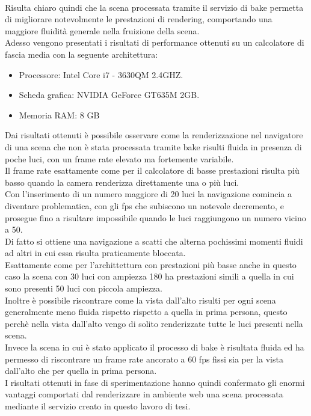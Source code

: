\\
Risulta chiaro quindi che la scena processata tramite il servizio di bake permetta di migliorare notevolmente le prestazioni di rendering, comportando una maggiore fluidità generale nella fruizione della scena. 
\\
Adesso vengono presentati i risultati di performance ottenuti su un calcolatore di fascia media con la seguente architettura:
\begin{itemize}
\item Processore: Intel Core i7 - 3630QM 2.4GHZ.
\item Scheda grafica: NVIDIA GeForce GT635M 2GB.
\item Memoria RAM: 8 GB
\end{itemize}
Dai risultati ottenuti è possibile osservare come la renderizzazione nel navigatore di una scena che non è stata processata tramite bake risulti fluida in presenza di poche luci, con un frame rate elevato ma fortemente variabile.
\\ 
Il frame rate esattamente come per il calcolatore di basse prestazioni risulta più basso quando la camera renderizza direttamente una o più luci.
\\
Con l’inserimento di un numero maggiore di 20 luci la navigazione comincia a diventare problematica, con gli fps che subiscono un notevole decremento, e prosegue fino a risultare impossibile quando le luci raggiungono un numero vicino a 50.
\\
Di fatto si ottiene una navigazione a scatti che alterna pochissimi momenti fluidi ad altri in cui essa risulta praticamente bloccata.
\\
Esattamente come per l’archittettura con prestazioni più basse anche in questo caso la scena con 30 luci con ampiezza 180 ha prestazioni simili a quella in cui sono presenti 50 luci con piccola ampiezza.
\\
Inoltre è possibile riscontrare come la vista dall’alto risulti per ogni scena generalmente meno fluida rispetto rispetto a quella in prima persona, questo perchè nella vista dall’alto vengo di solito renderizzate tutte le luci presenti nella scena.
\\
Invece la scena in cui è stato applicato il processo di bake è risultata fluida ed ha permesso di riscontrare un frame rate ancorato a 60 fps fissi sia per la vista dall’alto che per quella in prima persona.
\\
I risultati ottenuti in fase di sperimentazione hanno quindi confermato gli enormi vantaggi comportati dal renderizzare in ambiente web una scena processata mediante il servizio creato in questo lavoro di tesi.
